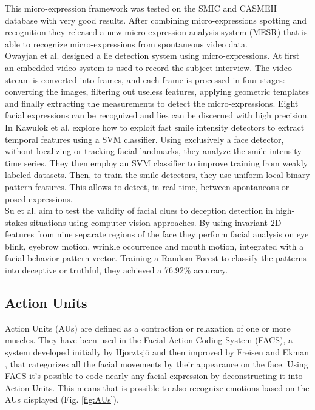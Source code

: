This micro-expression framework was tested on the SMIC and CASMEII database with very good results. After combining micro-expressions spotting and recognition they released a new micro-expression analysis system (MESR) that is able to recognize micro-expressions from spontaneous video data. \\
Owayjan et al. \cite{6462897} designed a lie detection system using micro-expressions. At first an embedded video system is used to record the subject interview. The video stream is converted into frames, and each frame is processed in four stages: converting the images, filtering out useless features, applying geometric templates and finally extracting the measurements to detect the micro-expressions. Eight facial expressions can be recognized and lies can be discerned with high precision. \\
In \cite{10.1007/978-3-319-47955-2_27} Kawulok et al. explore how to exploit fast smile intensity detectors to extract temporal features using a SVM classifier. Using exclusively a face detector, without localizing or tracking facial landmarks, they analyze the smile intensity time series. They then employ an SVM classifier to improve training from weakly labeled datasets. Then, to train the smile detectors, they use uniform local binary pattern features. This allows to detect, in real time, between spontaneous or posed expressions. \\
Su et al. \cite{SU201652} aim to test the validity of facial clues to deception detection in high-stakes situations using computer vision approaches. By using invariant 2D features from nine separate regions of the face they perform facial analysis on eye blink, eyebrow motion, wrinkle occurrence and mouth motion, integrated with a facial behavior pattern vector. Training a Random Forest to classify the patterns into deceptive or truthful, they achieved a 76.92\% accuracy. \\

\subsection{Action Units} \label{au}
Action Units (AUs) are defined as a contraction or relaxation of one or more muscles. They have been used in the Facial Action Coding System (FACS), a system developed initially by Hjorztsjö \cite{facsCH} and then improved by Freisen and Ekman \cite{facs1978}, that categorizes all the facial movements by their appearance on the face. Using FACS it's possible to code nearly any facial expression by deconstructing it into Action Units. This means that is possible to also recognize emotions based on the AUs displayed (Fig. \ref{fig:AUs}).

